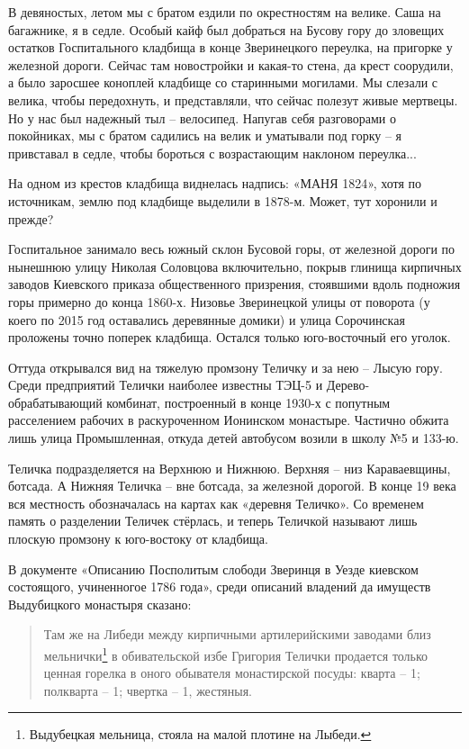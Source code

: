 В девяностых, летом мы с братом ездили по окрестностям на велике. Саша на багажнике, я в седле. Особый кайф был добраться на Бусову гору до зловещих остатков Госпитального кладбища в конце Зверинецкого переулка, на пригорке у железной дороги. Сейчас там новостройки и какая-то стена, да крест соорудили, а было заросшее коноплей кладбище со старинными могилами. Мы слезали с велика, чтобы передохнуть, и представляли, что сейчас полезут живые мертвецы. Но у нас был надежный тыл – велосипед. Напугав себя разговорами о покойниках, мы с братом садились на велик и уматывали под горку – я привставал в седле, чтобы бороться с возрастающим наклоном переулка...

На одном из крестов кладбища виднелась надпись: «МАНЯ 1824», хотя по источникам, землю под кладбище выделили в 1878-м. Может, тут хоронили и прежде?

Госпитальное занимало весь южный склон Бусовой горы, от железной дороги по нынешнюю улицу Николая Соловцова включительно, покрыв глинища кирпичных заводов Киевского приказа общественного призрения, стоявшими вдоль подножия горы примерно до конца 1860-х. Низовье Зверинецкой улицы от поворота (у коего по 2015 год оставались деревянные домики) и улица Сорочинская проложены точно поперек кладбища. Остался только юго-восточный его уголок.

Оттуда открывался вид на тяжелую промзону Теличку и за нею – Лысую гору. Среди предприятий Телички наиболее известны ТЭЦ-5 и Дерево-обрабатывающий комбинат, построенный в конце 1930-х с попутным расселением рабочих в раскуроченном Ионинском монастыре. Частично обжита лишь улица Промышленная, откуда детей автобусом возили в школу №5 и 133-ю. 

Теличка подразделяется на Верхнюю и Нижнюю. Верхняя – низ Караваевщины, ботсада. А Нижняя Теличка – вне ботсада, за железной дорогой. В конце 19 века вся местность обозначалась на картах как «деревня Теличко». Со временем память о разделении Теличек стёрлась, и теперь Теличкой называют лишь плоскую промзону к юго-востоку от кладбища. 

В документе «Описанию Посполитым слободи Зверинця в Уезде киевском состоящого, учиненногое 1786 года», среди описаний владений да имуществ Выдубицкого монастыря сказано:

\begin{quotation}
Там же на Либеди между кирпичными артилерийскими заводами близ мельнички\footnote{Выдубецкая мельница, стояла на малой плотине на Лыбеди.} в обивательской избе Григория Телички продается только ценная горелка в оного обывателя монастирской посуды: кварта – 1; полкварта – 1; чвертка – 1, жестяныя.\end{quotation}

